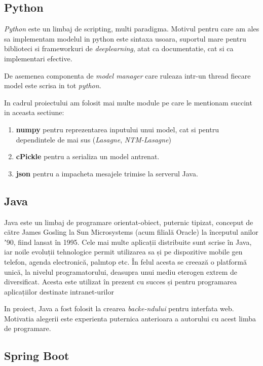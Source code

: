 \documentclass[12pt]{article}
\begin{document}
\subsection{Python}

\textit{Python} este un limbaj de scripting, multi paradigma. Motivul pentru care am ales sa implementam modelul in python este sintaxa usoara, suportul mare pentru biblioteci si frameworkuri de \textit{deeplearning}, atat ca documentatie, cat si ca implementari efective. 

De asemenea componenta de \textit{model manager} care ruleaza intr-un thread fiecare model este scrisa in tot \textit{python}.

In cadrul proiectului am folosit mai multe module pe care le mentionam succint in aceasta sectiune:
\begin{enumerate}
	\item \textbf{numpy} pentru reprezentarea inputului unui model, cat si pentru dependintele de mai sus (\textit{Lasagne}, \textit{NTM-Lasagne})
	\item \textbf{cPickle} pentru a serializa un model antrenat.
	\item \textbf{json} pentru a impacheta mesajele trimise la serverul Java.
\end{enumerate}


\subsection{Java}

Java este un limbaj de programare orientat-obiect, puternic tipizat, conceput de către James Gosling la Sun Microsystems (acum filială Oracle) la începutul anilor ʼ90, fiind lansat în 1995. Cele mai multe aplicații distribuite sunt scrise în Java, iar noile evoluții tehnologice permit utilizarea sa și pe dispozitive mobile gen telefon, agenda electronică, palmtop etc. În felul acesta se creează o platformă unică, la nivelul programatorului, deasupra unui mediu eterogen extrem de diversificat. Acesta este utilizat în prezent cu succes și pentru programarea aplicațiilor destinate intranet-urilor

In proiect, Java a fost folosit la crearea \textit{backe-ndului} pentru interfata web. Motivatia alegerii este experienta puternica anterioara a autorului cu acest limba de programare.

\subsection{Spring Boot}
\end{document}
